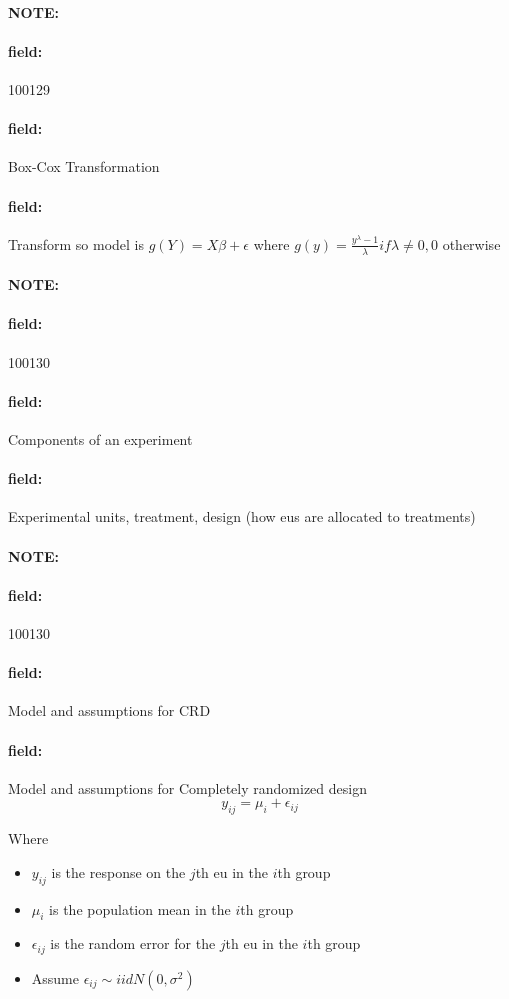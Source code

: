 \documentclass[12pt]{article}
\newenvironment{note}{\paragraph{NOTE:}}{}
\newenvironment{field}{\paragraph{field:}}{}
\begin{document}
\begin{note} \begin{field} \tiny 100129 \end{field}
 \begin{field}
  Box-Cox Transformation
 \end{field}
 \begin{field}
  Transform so model is $g(Y) = X\beta + \epsilon$
  where $g(y) = \frac{y^\lambda -1}{\lambda} if \lambda \neq 0, 0 $ otherwise
 \end{field}
\end{note}




\begin{note}
 \begin{field}
  \tiny 100130
 \end{field}
 \begin{field}
  Components of an experiment
 \end{field}
 \begin{field}
  Experimental units, treatment, design (how eus are allocated to treatments)
 \end{field}
\end{note}



\begin{note}
 \begin{field}
  \tiny 100130
 \end{field}
 \begin{field}
  Model and assumptions for CRD
 \end{field}
 \begin{field}
  Model and assumptions for Completely randomized design
  $$y_{ij} = \mu_i + \epsilon_{ij}$$

  Where
  \begin{itemize}
   \item $y_{ij}$ is the response on the $j$th eu in the $i$th group
   \item $\mu_i$ is the population mean in the $i$th group
   \item $\epsilon_{ij}$ is the random error for the $j$th eu in the $i$th group
   \item Assume $\epsilon_{ij} \sim iid N(0,\sigma^2)$
  \end{itemize}
 \end{field}
\end{note}
\end{document}
